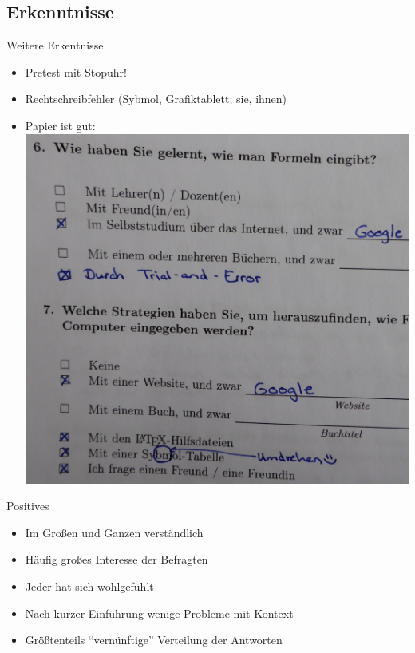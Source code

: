
\subsection{Erkenntnisse}



\begin{frame}{Weitere Erkentnisse}
\begin{itemize}[<+->]
    \item Pretest mit Stopuhr!
    \item Rechtschreibfehler (Sybmol, Grafiktablett; sie, ihnen)
    \item Papier ist gut:\\
    \includegraphics*[width=0.6\linewidth, keepaspectratio]{../images/warum-papier-gut-ist.jpg}
\end{itemize}
\end{frame}

\begin{frame}{Positives}
\begin{itemize}[<+->]
    \item Im Großen und Ganzen verständlich
    \item Häufig großes Interesse der Befragten
    \item Jeder hat sich wohlgefühlt
    \item Nach kurzer Einführung wenige Probleme mit Kontext
    \item Größtenteils \enquote{vernünftige} Verteilung der Antworten
\end{itemize}
\end{frame}